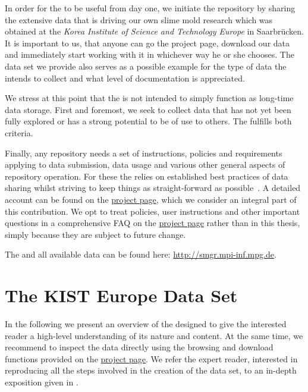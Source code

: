  	In order for the \SMGR to be useful from day one, we initiate the repository by sharing the extensive data that is driving our own slime mold research which was obtained at the \emph{Korea Institute of Science and Technology Europe} in Saarbr\"ucken. It is important to us, that anyone can go the \SMGR project page, download our data and immediately start working with it in whichever way he or she chooses. The data set we provide also serves as a possible example for the type of data the \SMGR intends to collect and what level of documentation is appreciated. 

 	We stress at this point that the \SMGR is not intended to simply function as long-time data storage. First and foremost, we seek to collect data that has not yet been fully explored or has a strong potential to be of use to others. The \data fulfills both criteria.

	Finally, any repository needs a set of instructions, policies and requirements applying to data submission, data usage and various other general aspects of repository operation. For these the \SMGR relies on established best practices of data sharing whilst striving to keep things as straight-forward as possible~\cite{white2013nine}. A detailed account can be found on the \href{http://smgr.mpi-inf.mpg.de}{\SMGR project page}, which we consider an integral part of this contribution. We opt to treat policies, user instructions and other important questions in a comprehensive FAQ on the \href{http://smgr.mpi-inf.mpg.de}{\SMGR project page} rather than in this thesis, simply because they are subject to future change.

	The \SMGR and all available data can be found here: \href{http://smgr.mpi-inf.mpg.de}{http://smgr.mpi-inf.mpg.de}. 

\section{The KIST Europe Data Set}	

	In the following we present an overview of the \data designed to give the interested reader a high-level understanding of its nature and content. At the same time, we recommend to inspect the data directly using the browsing and download functions provided on the \href{http://smgr.mpi-inf.mpg.de}{\SMGR project page}. We refer the expert reader, interested in reproducing all the steps involved in the creation of the data set, to an in-depth exposition given in .

